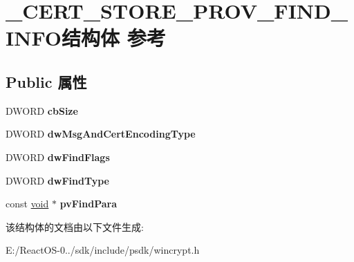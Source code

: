 \hypertarget{struct___c_e_r_t___s_t_o_r_e___p_r_o_v___f_i_n_d___i_n_f_o}{}\section{\+\_\+\+C\+E\+R\+T\+\_\+\+S\+T\+O\+R\+E\+\_\+\+P\+R\+O\+V\+\_\+\+F\+I\+N\+D\+\_\+\+I\+N\+F\+O结构体 参考}
\label{struct___c_e_r_t___s_t_o_r_e___p_r_o_v___f_i_n_d___i_n_f_o}
\subsection*{Public 属性}
\begin{DoxyCompactItemize}
\item 
\mbox{\label{struct___c_e_r_t___s_t_o_r_e___p_r_o_v___f_i_n_d___i_n_f_o_a7aac9ab9dd7bb3d2a8f23b516020fd1a}} 
D\+W\+O\+RD {\bfseries cb\+Size}
\item 
\mbox{\label{struct___c_e_r_t___s_t_o_r_e___p_r_o_v___f_i_n_d___i_n_f_o_a850040298209db06802f5188703d9e3f}} 
D\+W\+O\+RD {\bfseries dw\+Msg\+And\+Cert\+Encoding\+Type}
\item 
\mbox{\label{struct___c_e_r_t___s_t_o_r_e___p_r_o_v___f_i_n_d___i_n_f_o_a5e5bbf129f15800aa2428be740e16017}} 
D\+W\+O\+RD {\bfseries dw\+Find\+Flags}
\item 
\mbox{\label{struct___c_e_r_t___s_t_o_r_e___p_r_o_v___f_i_n_d___i_n_f_o_a964deca0626e941265393afca87fb0d5}} 
D\+W\+O\+RD {\bfseries dw\+Find\+Type}
\item 
\mbox{\label{struct___c_e_r_t___s_t_o_r_e___p_r_o_v___f_i_n_d___i_n_f_o_a8d54546b5b3a9807767e7a0d4ab4ea45}} 
const \hyperlink{interfacevoid}{void} $\ast$ {\bfseries pv\+Find\+Para}
\end{DoxyCompactItemize}


该结构体的文档由以下文件生成\+:\begin{DoxyCompactItemize}
\item 
E\+:/\+React\+O\+S-\/0../sdk/include/psdk/wincrypt.\+h\end{DoxyCompactItemize}
